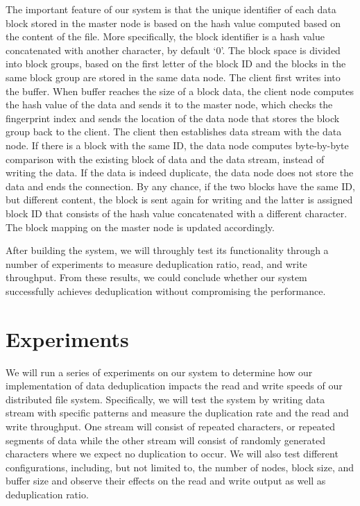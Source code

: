 \documentclass[11pt]{article}
\begin{document}
The important feature of our system is that the unique identifier of each data block stored in the master node is based on the hash value computed based on the content of the file. More specifically, the block identifier is a hash value concatenated with another character, by default `0'. The block space is divided into block groups, based on the first letter of the block ID and the blocks in the same block group are stored in the same data node. The client first writes into the buffer. When buffer reaches the size of a block data, the client node computes the hash value of the data and sends it to the master node, which checks the fingerprint index and sends the location of the data node that stores the block group back to the client. The client then establishes data stream with the data node. If there is a block with the same ID, the data node computes byte-by-byte comparison with the existing block of data and the data stream, instead of writing the data. If the data is indeed duplicate, the data node does not store the data and ends the connection. By any chance, if the two blocks have the same ID, but different content, the block is sent again for writing and the latter is assigned block ID that consists of the hash value concatenated with a different character. The block mapping on the master node is updated accordingly.

After building the system, we will throughly test its functionality through a number of experiments to measure deduplication ratio, read, and write throughput. From these results, we could conclude whether our system successfully achieves deduplication without compromising the performance.

\section {Experiments}\label{exper}

We will run a series of experiments on our system to determine how our implementation of data deduplication impacts the read and write speeds of our distributed file system. Specifically, we will test the system by writing data stream with specific patterns and measure the duplication rate and the read and write throughput. One stream will consist of repeated characters, or repeated segments of data while the other stream will consist of randomly generated characters where we expect no duplication to occur. We will also test different configurations, including, but not limited to, the number of nodes, block size, and buffer size and observe their effects on the read and write output as well as deduplication ratio.
\end{document}
